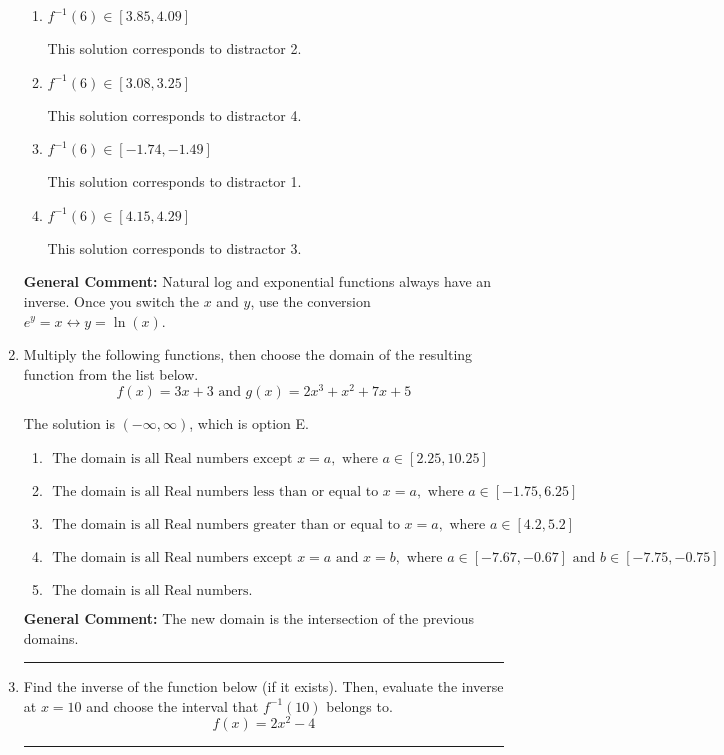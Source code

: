 \documentclass{extbook}[14pt]
\newcommand{\litem}[1]{\item #1

\rule{\textwidth}{0.4pt}}
\begin{document}
\begin{enumerate}
{\begin{enumerate}[label=\Alph*.]
 This is the solution.
\item \( f^{-1}(6) \in [3.85, 4.09] \)

 This solution corresponds to distractor 2.
\item \( f^{-1}(6) \in [3.08, 3.25] \)

 This solution corresponds to distractor 4.
\item \( f^{-1}(6) \in [-1.74, -1.49] \)

 This solution corresponds to distractor 1.
\item \( f^{-1}(6) \in [4.15, 4.29] \)

 This solution corresponds to distractor 3.
\end{enumerate}

\textbf{General Comment:} Natural log and exponential functions always have an inverse. Once you switch the $x$ and $y$, use the conversion $ e^y = x \leftrightarrow y=\ln(x)$.
}
\litem{
Multiply the following functions, then choose the domain of the resulting function from the list below.
\[ f(x) = 3x + 3 \text{ and } g(x) = 2x^{3} + x^{2} +7 x + 5 \]

The solution is \( (-\infty, \infty) \), which is option E.\begin{enumerate}[label=\Alph*.]
\item \( \text{ The domain is all Real numbers except } x = a, \text{ where } a \in [2.25, 10.25] \)


\item \( \text{ The domain is all Real numbers less than or equal to } x = a, \text{ where } a \in [-1.75, 6.25] \)


\item \( \text{ The domain is all Real numbers greater than or equal to } x = a, \text{ where } a \in [4.2, 5.2] \)


\item \( \text{ The domain is all Real numbers except } x = a \text{ and } x = b, \text{ where } a \in [-7.67, -0.67] \text{ and } b \in [-7.75, -0.75] \)


\item \( \text{ The domain is all Real numbers. } \)


\end{enumerate}

\textbf{General Comment:} The new domain is the intersection of the previous domains.
}
\litem{
Find the inverse of the function below (if it exists). Then, evaluate the inverse at $x = 10$ and choose the interval that $f^{-1}(10)$ belongs to.
\[ f(x) = 2 x^2 - 4 \]

}
\end{enumerate}
\end{document}
